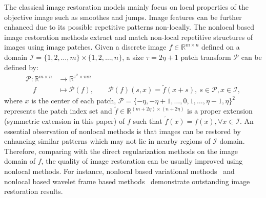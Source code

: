 \documentclass[letterpaper,10pt]{article}
\newcommand{\R}{\mathbb{R}}
\def\RR{\mathbb{R}}
\begin{document}
The classical image restoration models mainly focus on local properties of the objective image such as smoothes and jumps. Image features can be further enhanced due to its possible repetitive patterns non-locally. The nonlocal based image restoration methods \cite{buades2005non,dabov2006image,Gilboa2008} extract and match non-local repetitive structures of images using image patches. Given a discrete image $f \in \RR^{m \times n}$ defined on a domain $\mathscr{I} =  \{1,2,\ldots,m\} \times \{1,2,\ldots,n\}$, a size $\tau = 2 \eta +1$ patch transform $\mathcal{P}$ can be defined by:
\begin{equation}\label{patch minifold}
\begin{aligned}
\mathcal{P}: \RR^{m \times n}  & \rightarrow \RR^{\tau^2 \times mn}  \\ \quad f & \mapsto \mathcal{P}(f) ,\qquad
\mathcal{P}(f) (s,x)   = \tilde{f}(x+s), ~s \in \mathscr{P},x \in \mathscr{I},
\end{aligned}
\end{equation}
where $x$ is the center of each patch, $\mathscr{P} =  \{-\eta, -\eta+1, \ldots,0,1,\ldots,\eta-1,\eta\}^2$ represents the patch index set and $\tilde{f} \in \R^{(m+ 2 \eta) \times (n+ 2 \eta)}$ is a proper extension (symmetric extension in this paper) of $f$ such that $\tilde{f}(x) = f(x), \forall x \in \mathscr{I}$.
An essential observation of nonlocal methods is that images can be restored by enhancing similar patterns which may not lie in nearby regions of $\mathscr{I}$ domain. Therefore, comparing with the direct regularization methods on the image domain of $f$, the quality of image restoration can be usually improved using nonlocal methods. For instance, nonlocal based variational methods~\cite{buades2005non,Gilboa2008,zhang2010wavelet} and nonlocal based wavelet frame based methods~\cite{quan2015data} demonstrate outstanding image restoration results.
\end{document}
